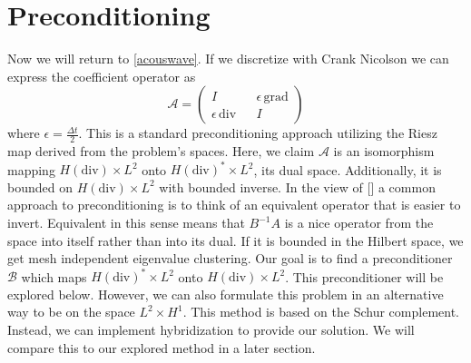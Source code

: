 \documentclass[11pt]{article}
\newcommand{\divv}{\mathrm{div}}
\newcommand{\gradd}{\mathrm{grad}}
\begin{document}
\section{Preconditioning}
Now we will return to \eqref{acouswave}. If we discretize with Crank Nicolson we can express the coefficient operator as
\begin{equation}
\mathscr{A} = \begin{pmatrix}
I && \epsilon\,\gradd \\
\epsilon\,\divv && I
\end{pmatrix}
\end{equation}
where $\epsilon = \frac{\Delta t}{2}$. This is a standard preconditioning approach utilizing the Riesz map derived from the problem's spaces. 
Here, we claim $\mathscr{A}$ is an isomorphism mapping  $H(\divv) \times L^2$ onto $H(\divv)^*\times L^2$, its dual space. Additionally, it is bounded on $H(\divv) \times L^2$ with bounded inverse. In the view of [] a common approach to preconditioning is to think of an equivalent operator that is easier to invert. Equivalent in this sense means that $B^{-1}A$ is a nice operator from the space into itself rather than into its dual. If it is bounded in the Hilbert space, we get mesh independent eigenvalue clustering. Our goal is to find a preconditioner $\mathscr{B}$ which maps $H(\divv)^* \times L^2$ onto $H(\divv) \times L^2$. This preconditioner will be explored below. However, we can also formulate this problem in an alternative way to be on the space $L^2 \times H^1$. This method is based on the Schur complement. %
Instead, we can implement hybridization to provide our solution. We will compare this to our explored method in a later section.


\end{document}
